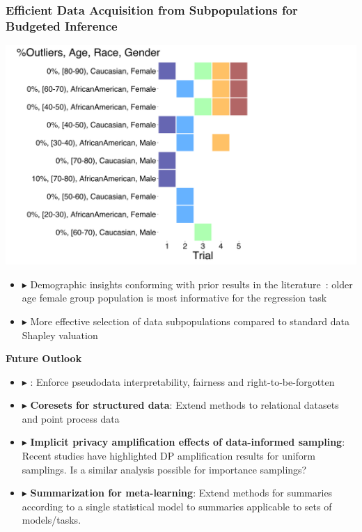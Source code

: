 \documentclass[hyperref={colorlinks = true},unknownkeysallowed]{beamer}
\let\oldcitep=\citep
\renewcommand\citep[1]{\hypersetup{linkcolor=UBCblue}\hyperlink{#1}{\oldcitep{#1}}}
\begin{document}
\begin{frame}
	\frametitle{Efficient Data Acquisition from Subpopulations for Budgeted Inference}
	\centering
	\includegraphics[width=.49\textwidth]{figs/selected_groups.png}	
	\pause 
	\begin{itemize}
		\item $\blacktriangleright$ Demographic insights conforming with prior results in the literature~\citep{ghorbani19}: older age female group population is most informative for the regression task
		\item $\blacktriangleright$ More effective selection of data subpopulations compared to standard data Shapley valuation~\citep{shapley53}
	\end{itemize}
\end{frame}





\begin{frame}
	\LARGE{\textbf{Future Outlook}}
\end{frame}

\begin{frame}
	\begin{itemize}
		\item $\blacktriangleright$  : Enforce pseudodata interpretability, fairness and right-to-be-forgotten
		\item $\blacktriangleright$  \textbf{Coresets for structured data}: Extend methods to relational datasets and point process data
		\item $\blacktriangleright$ \textbf{Implicit privacy amplification effects of data-informed sampling}: Recent studies have highlighted DP amplification results for uniform samplings. Is a similar analysis possible for importance samplings?
		\item $\blacktriangleright$ \textbf{Summarization for meta-learning}: Extend methods for summaries according to a single statistical model to summaries applicable to sets of models/tasks.
	\end{itemize}
\end{frame}
\end{document}
